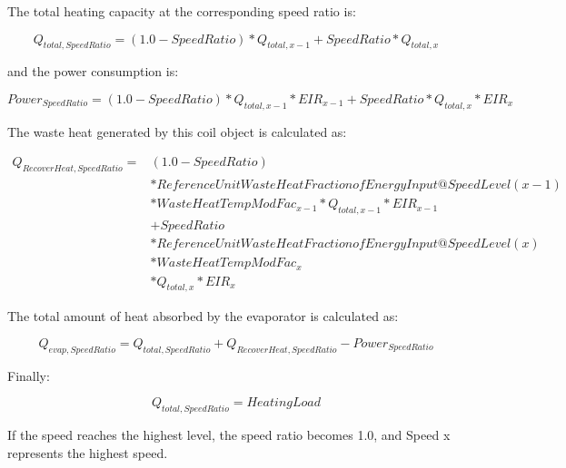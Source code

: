 The total heating capacity at the corresponding speed ratio is:

\begin{equation}
{Q_{total,SpeedRatio}} = \left( {1.0 - SpeedRatio} \right)*{Q_{total,x - 1}} + SpeedRatio*{Q_{total,x}}
\end{equation}

and the power consumption is:

\begin{equation}
Powe{r_{SpeedRatio}} = \left( {1.0 - SpeedRatio} \right)*{Q_{total,x - 1}}*EI{R_{x - 1}} + SpeedRatio*{Q_{total,x}}*EI{R_x}
\end{equation}

The waste heat generated by this coil object is calculated as:

\begin{equation}
  \begin{array}{rl}
    Q_{RecoverHeat,SpeedRatio} =& \left( 1.0 - SpeedRatio \right) \\
                               &* ReferenceUnitWasteHeatFractionofEnergyInput@SpeedLevel\left( {x - 1} \right) \\
                               &* WasteHeatTempModFac_{x - 1} * Q_{total,x - 1} * EIR_{x - 1} \\
                               &+ SpeedRatio \\
                               &* ReferenceUnitWasteHeatFractionofEnergyInput@SpeedLevel\left( x \right) \\
                               &* WasteHeatTempModFac_x \\
                               &* Q_{total,x} * EIR_x
  \end{array}
\end{equation}

The total amount of heat absorbed by the evaporator is calculated as:

\begin{equation}
{Q_{evap,SpeedRatio}} = {Q_{total,SpeedRatio}} + {\mathrm{}}{Q_{RecoverHeat,SpeedRatio}} - Powe{r_{SpeedRatio}}
\end{equation}

Finally:

\begin{equation}
{Q_{total,SpeedRatio}} = HeatingLoad
\end{equation}

If the speed reaches the highest level, the speed ratio becomes 1.0, and Speed x represents the highest speed.

